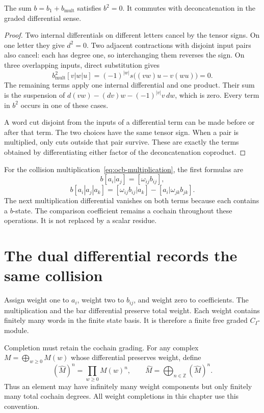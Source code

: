 \begin{proposition}\label{prop:ocb-bar-square}
The sum $b=b_1+b_{\mathrm{mult}}$ satisfies $b^2=0$.
It commutes with deconcatenation in the graded differential sense.
\end{proposition}

\begin{proof}
Two internal differentials on different letters cancel by the tensor
signs. On one letter they give $d^2=0$.
Two adjacent contractions with disjoint input pairs also cancel:
each has degree one, so interchanging them reverses the sign.
On three overlapping inputs, direct substitution gives
\[
 b_{\mathrm{mult}}^2[v|w|u]
 =(-1)^{|w|}s\bigl((vw)u-v(wu)\bigr)=0.
\]
The remaining terms apply one internal differential and one product.
Their sum is the suspension of
$d(vw)-(dv)w-(-1)^{|v|}v\,dw$, which is zero.
Every term in $b^2$ occurs in one of these cases.

A word cut disjoint from the inputs of a differential term can be
made before or after that term.
The two choices have the same tensor sign.
When a pair is multiplied, only cuts outside that pair survive.
These are exactly the terms obtained by differentiating either
factor of the deconcatenation coproduct.
\end{proof}

For the collision multiplication~\eqref{eq:ocb-multiplication},
the first formulas are
\[
 b[a_i|a_j]=[\omega_{ij}b_{ij}],
\]
\[
 b[a_i|a_j|a_k]
 =[\omega_{ij}b_{ij}|a_k]
  -[a_i|\omega_{jk}b_{jk}].
\]
The next multiplication differential vanishes on both terms because
each contains a $b$-state.
The comparison coefficient remains a cochain throughout these
operations. It is not replaced by a scalar residue.

\section{The dual differential records the same collision}

Assign weight one to $a_i$, weight two to $b_{ij}$, and weight
zero to coefficients. The multiplication and the bar differential
preserve total weight.
Each weight contains finitely many words in the finite state basis.
It is therefore a finite free graded $C_I$-module.

Completion must retain the cochain grading. For any complex
$M=\bigoplus_{w\ge0}M(w)$ whose differential preserves weight, define
\[
 (\widehat M)^n=\prod_{w\ge0}M(w)^n,
 \qquad
 \widehat M=\bigoplus_{n\in\mathbb Z}(\widehat M)^n.
\]
Thus an element may have infinitely many weight components but only
finitely many total cochain degrees. All weight completions in this
chapter use this convention.

